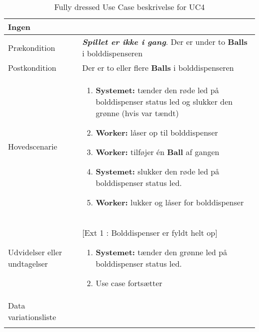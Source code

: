 \documentclass[Kravspecifikation/Kravspec_Main.tex]{subfiles}
\begin{document}
\begin{longtable}[]{@{}ll@{}}
\begin{minipage}[t]{0.47\columnwidth}
{Ingen}\strut
\end{minipage}\tabularnewline
\toprule
\begin{minipage}[t]{0.47\columnwidth}\raggedright
{Prækondition}\strut
\end{minipage} & \begin{minipage}[t]{0.47\columnwidth}\raggedright
{\textbf{\textit{Spillet er ikke i gang}}.
Der er under to \textbf{Balls} i bolddispenseren}\strut
\end{minipage}\tabularnewline
\toprule
\begin{minipage}[t]{0.47\columnwidth}\raggedright
{Postkondition}\strut
\end{minipage} & \begin{minipage}[t]{0.47\columnwidth}\raggedright
{Der er to eller flere \textbf{Balls} i bolddispenseren }\strut
\end{minipage}\tabularnewline
\toprule
\begin{minipage}[t]{0.47\columnwidth}\raggedright
{Hovedscenarie}\strut
\end{minipage} & \begin{minipage}[t]{0.47\columnwidth}\raggedright
\begin{enumerate}
\tightlist
\item
  {\textbf{Systemet:} tænder den røde led på bolddispenser status led og slukker den grønne (hvis var tændt)}
\item
  {\textbf{Worker:} låser op til bolddispenser}
\item
  {\textbf{Worker:} tilføjer én \textbf{Ball} af gangen}
\item \textbf{Systemet:} slukker den røde led på bolddispenser status led. 
\item 
  {\textbf{Worker:} lukker og låser for bolddispenser }
\end{enumerate}\strut
\end{minipage}\tabularnewline
\toprule
\begin{minipage}[t]{0.47\columnwidth}\raggedright
{Udvidelser eller undtagelser}\strut
\end{minipage} & \begin{minipage}[t]{0.47\columnwidth}\raggedright
{[Ext 1 : Bolddispenser er fyldt helt op]
\begin{enumerate}
\tightlist
\item
  \textbf{Systemet:} tænder den grønne led på bolddispenser status led.
\item  Use case fortsætter
\end{enumerate}
}\strut
\end{minipage}\tabularnewline
\toprule
\begin{minipage}[t]{0.47\columnwidth}\raggedright
{Data variationsliste}\strut
\end{minipage} & \begin{minipage}[t]{0.47\columnwidth}\raggedright
{}\strut
\end{minipage}\tabularnewline
\bottomrule
\bottomrule
\caption{Fully dressed Use Case beskrivelse for UC4}
\label{tab:UC4}
\end{longtable}
\end{document}
